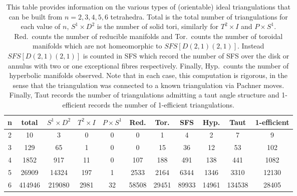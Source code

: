 \documentclass[12pt,reqno]{amsart}  %
\theoremstyle{definition}
\theoremstyle{remark}
\begin{document}
\begin{table}[h]
\begin{tabular}{|c|c|c|c|c|c|c|c|c||c|c|}
\hline
n &	total& 	$S^1\times D^2$ &	$T^2 \times I$	& $P \times S^1$ &	Red.	& Tor. &	SFS & Hyp. &Taut	&1-efficient\\
\hline
2&	10&	   3&	    0&	  0&	0&	1&	 4&	2&	7&	9\\
\hline
3&	129&	   65	&    1&	  0&	0&	15&	 36&	12&		53&	102\\
\hline
4&	1852& 917& 11& 0&	107&	188& 	491&	138&		441&	1082\\
\hline
5 &26909&	14324&	197&	1&	2533& 	2164&	6344&	1346& 3310 &	12130\\
\hline
6&414946  &219080 &2981 & 32& 58508& 29451& 89933 &14961 &134538 & 28405  \\
\hline
\end{tabular}

\caption{\label{table:smalltetcensus} This table provides information on 
the various types of (orientable) ideal triangulations that can be built 
from $n=2,3,4,5,6$ tetrahedra. Total is the total number of triangulations 
for each value of $n$, $S^1\times D^2$ is the number of solid tori, 
similarly for $T^2\times I$ and $P\times S^1$. Red.~counts the number of 
reducible manifolds and Tor.~counts the number of toroidal manifolds which 
are not homeomorphic to $SFS[D(2,1)(2,1)]$. Instead $SFS[D(2,1)(2,1)]$ is 
counted in SFS which record the number of SFS over the disk or annulus 
with two or one exceptional fibres respectively. Finally, Hyp.~counts the 
number of hyperbolic manifolds observed. Note that in each case, this 
computation is rigorous, in the sense that the triangulation was connected 
to a known triangulation via Pachner moves. Finally, Taut records the number 
of triangulations admitting a taut angle structure and 1-efficient records 
the number of 1-efficient triangulations.}
\end{table}
\end{document}
